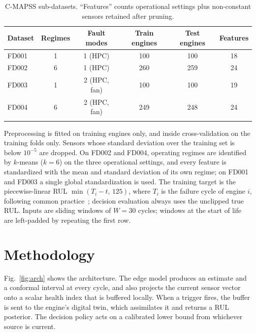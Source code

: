 \documentclass[pdflatex,sn-mathphys-num]{sn-jnl}
\begin{document}
\begin{table}[t]
\caption{C-MAPSS sub-datasets. ``Features'' counts operational settings plus non-constant sensors retained after pruning.}\label{tab:data}
\begin{tabular*}{\textwidth}{@{\extracolsep\fill}lccccc}
\toprule
Dataset & Regimes & Fault modes & Train engines & Test engines & Features \\
\midrule
FD001 & 1 & 1 (HPC) & 100 & 100 & 18 \\
FD002 & 6 & 1 (HPC) & 260 & 259 & 24 \\
FD003 & 1 & 2 (HPC, fan) & 100 & 100 & 19 \\
FD004 & 6 & 2 (HPC, fan) & 249 & 248 & 24 \\
\botrule
\end{tabular*}
\end{table}

Preprocessing is fitted on training engines only, and inside cross-validation on the training folds only. Sensors whose standard deviation over the training set is below $10^{-5}$ are dropped. On FD002 and FD004, operating regimes are identified by $k$-means ($k=6$) on the three operational settings, and every feature is standardized with the mean and standard deviation of its own regime; on FD001 and FD003 a single global standardization is used. The training target is the piecewise-linear RUL $\min(T_i - t,\,125)$, where $T_i$ is the failure cycle of engine $i$, following common practice~\cite{li2018dcnn}; decision evaluation always uses the unclipped true RUL. Inputs are sliding windows of $W = 30$ cycles; windows at the start of life are left-padded by repeating the first row.

\section{Methodology}\label{sec:method}

Fig.~\ref{fig:arch} shows the architecture. The edge model produces an estimate and a conformal interval at every cycle, and also projects the current sensor vector onto a scalar health index that is buffered locally. When a trigger fires, the buffer is sent to the engine's digital twin, which assimilates it and returns a RUL posterior. The decision policy acts on a calibrated lower bound from whichever source is current.
\end{document}
